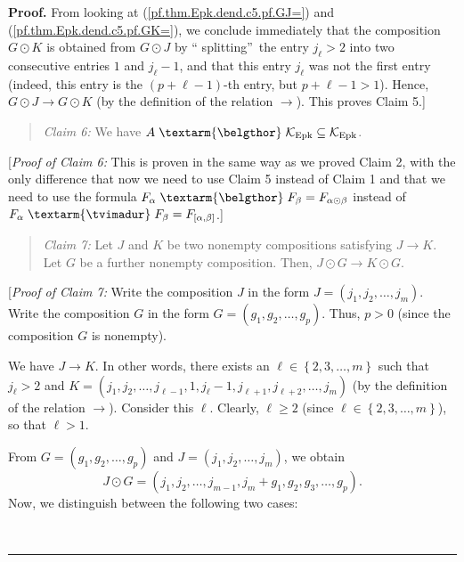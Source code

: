 \documentclass[numbers=enddot,12pt,final,onecolumn,notitlepage]{scrartcl}%
\theoremstyle{definition}
\newenvironment{statement}{\begin{quote}}{\end{quote}}
\newenvironment{proof}[1][Proof]{\noindent\textbf{#1.} }{\ \rule{0.5em}{0.5em}}
\newenvironment{verlong}{}{}
\newcommand{\tvi}{\left. \textarm{\tvimadur} \right.}
\newcommand{\bel}{\left. \textarm{\belgthor} \right.}
\begin{document}
\begin{verlong}
\begin{proof}
From looking at (\ref{pf.thm.Epk.dend.c5.pf.GJ=}) and
(\ref{pf.thm.Epk.dend.c5.pf.GK=}), we conclude immediately that the
composition $G\odot K$ is obtained from $G\odot J$ by \textquotedblleft
splitting\textquotedblright\ the entry $j_{\ell}>2$ into two consecutive
entries $1$ and $j_{\ell}-1$, and that this entry $j_{\ell}$ was not the first
entry (indeed, this entry is the $\left(  p+\ell-1\right)  $-th entry, but
$p+\ell-1>1$). Hence, $G\odot J\rightarrow G\odot K$ (by the definition of the
relation $\rightarrow$). This proves Claim 5.]

\begin{statement}
\textit{Claim 6:} We have $A\bel\mathcal{K}_{\operatorname*{Epk}}%
\subseteq\mathcal{K}_{\operatorname*{Epk}}$.
\end{statement}

[\textit{Proof of Claim 6:} This is proven in the same way as we proved Claim
2, with the only difference that now we need to use Claim 5 instead of Claim 1
and that we need to use the formula $F_{\alpha}\bel  F_{\beta}=F_{\alpha
\odot\beta}$ instead of $F_{\alpha}\tvi  F_{\beta}=F_{\left[  \alpha
,\beta\right]  }$.]

\begin{statement}
\textit{Claim 7:} Let $J$ and $K$ be two nonempty compositions satisfying
$J\rightarrow K$. Let $G$ be a further nonempty composition. Then, $J\odot
G\rightarrow K\odot G$.
\end{statement}

[\textit{Proof of Claim 7:} Write the composition $J$ in the form $J=\left(
j_{1},j_{2},\ldots,j_{m}\right)  $. Write the composition $G$ in the form
$G=\left(  g_{1},g_{2},\ldots,g_{p}\right)  $. Thus, $p>0$ (since the
composition $G$ is nonempty).

We have $J\rightarrow K$. In other words, there exists an $\ell\in\left\{
2,3,\ldots,m\right\}  $ such that $j_{\ell}>2$ and $K=\left(  j_{1}%
,j_{2},\ldots,j_{\ell-1},1,j_{\ell}-1,j_{\ell+1},j_{\ell+2},\ldots
,j_{m}\right)  $ (by the definition of the relation $\rightarrow$). Consider
this $\ell$. Clearly, $\ell\geq2$ (since $\ell\in\left\{  2,3,\ldots
,m\right\}  $), so that $\ell>1$.

From $G=\left(  g_{1},g_{2},\ldots,g_{p}\right)  $ and $J=\left(  j_{1}%
,j_{2},\ldots,j_{m}\right)  $, we obtain%
\begin{equation}
J\odot G=\left(  j_{1},j_{2},\ldots,j_{m-1},j_{m}+g_{1},g_{2},g_{3}%
,\ldots,g_{p}\right)  . \label{pf.thm.Epk.dend.c7.pf.JG=}%
\end{equation}
Now, we distinguish between the following two cases:


\end{proof}
\end{verlong}
\end{document}
